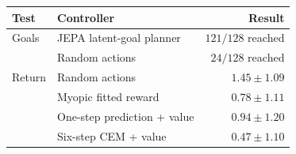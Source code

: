 \begin{tabular}{llr}
\toprule
\rowcolor{Navy!8}
Test & Controller & Result \\
\midrule
\rowcolor{JEPA!7}
Goals & JEPA latent-goal planner & $121/128$ reached \\
 & Random actions & $24/128$ reached \\
\midrule
\rowcolor{Real!7}
Return & Random actions & $1.45\pm1.09$ \\
 & Myopic fitted reward & $0.78\pm1.11$ \\
 & One-step prediction + value & $0.94\pm1.20$ \\
\rowcolor{JEPA!7}
 & Six-step CEM + value & $0.47\pm1.10$ \\
\bottomrule
\end{tabular}
